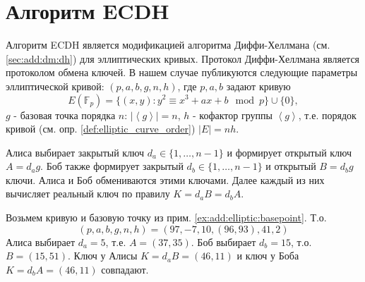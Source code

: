 \section{Алгоритм ECDH}

Алгоритм ECDH является модификацией алгоритма Диффи-Хеллмана (см.
\autoref{sec:add:dm:dh}) для эллиптических кривых. Протокол
Диффи-Хеллмана является протоколом обмена ключей. В нашем случае
публикуются следующие параметры эллиптической кривой:
$(p,a,b,g,n,h)$, где $p,a,b$ задают кривую 
\[
E\left(\mathbb{F}_p\right) = \{(x,y): y^2 \equiv x^3 +a x + b \mod p
\} \cup \{0\},
\]
$g$ - базовая точка порядка $n$: $\left|\left<g\right>\right| = n$,
$h$ - кофактор группы $\left<g\right>$, т.е. 
порядок кривой (см.
опр. \ref{def:elliptic_curve_order})
$\left|E\right| = nh$.

Алиса выбирает закрытый ключ $d_a \in \{1, \dots, n - 1\}$ и формирует
открытый ключ $A = d_a g$. Боб также формирует закрытый $d_b \in
\{1, \dots, n - 1\}$ и открытый $B = d_b g$ ключи. Алиса и Боб
обмениваются этими ключами. Далее каждый из них вычисляет реальный
ключ по правилу $K = d_a B = d_b A$. 


\begin{example}
\label{ex:add:discretmath:ecdh}
Возьмем кривую и базовую точку из прим.
\ref{ex:add:elliptic:basepoint}. Т.о. 
\[
(p,a,b,g,n,h) = (97, -7, 10, (96,93), 41, 2)
\]
Алиса выбирает $d_a = 5$, т.е. 
$A = (37, 35)$. Боб выбирает $d_b = 15$, т.о. $B = (15,51)$. Ключ у
Алисы $K = d_a B = (46,11)$ и ключ у Боба $K = d_b A = (46,11)$
совпадают. 
\end{example}
